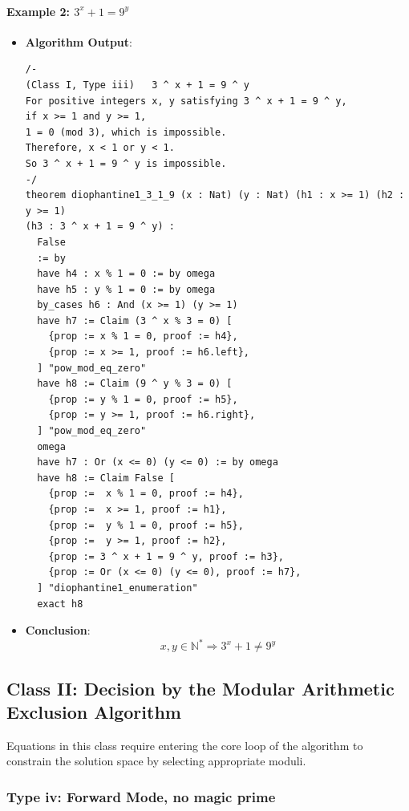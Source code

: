 \documentclass{article}
\begin{document}
\paragraph{Example 2: $3^x+1=9^y$}
\begin{itemize}
\item \textbf{Algorithm Output}:
    \begin{verbatim}
/-
(Class I, Type iii)   3 ^ x + 1 = 9 ^ y
For positive integers x, y satisfying 3 ^ x + 1 = 9 ^ y,
if x >= 1 and y >= 1,
1 = 0 (mod 3), which is impossible.
Therefore, x < 1 or y < 1.
So 3 ^ x + 1 = 9 ^ y is impossible.
-/
theorem diophantine1_3_1_9 (x : Nat) (y : Nat) (h1 : x >= 1) (h2 : y >= 1) 
(h3 : 3 ^ x + 1 = 9 ^ y) :      
  False
  := by
  have h4 : x % 1 = 0 := by omega
  have h5 : y % 1 = 0 := by omega
  by_cases h6 : And (x >= 1) (y >= 1)
  have h7 := Claim (3 ^ x % 3 = 0) [
    {prop := x % 1 = 0, proof := h4},
    {prop := x >= 1, proof := h6.left},
  ] "pow_mod_eq_zero"
  have h8 := Claim (9 ^ y % 3 = 0) [
    {prop := y % 1 = 0, proof := h5},
    {prop := y >= 1, proof := h6.right},
  ] "pow_mod_eq_zero"
  omega
  have h7 : Or (x <= 0) (y <= 0) := by omega
  have h8 := Claim False [
    {prop :=  x % 1 = 0, proof := h4},
    {prop :=  x >= 1, proof := h1},
    {prop :=  y % 1 = 0, proof := h5},
    {prop :=  y >= 1, proof := h2},
    {prop := 3 ^ x + 1 = 9 ^ y, proof := h3},
    {prop := Or (x <= 0) (y <= 0), proof := h7},
  ] "diophantine1_enumeration"
  exact h8
    \end{verbatim}
    \item \textbf{Conclusion}:
    \[ x, y \in \mathbb{N}^* \Rightarrow 3^x + 1 \neq 9^y \]
\end{itemize}

\subsection{Class II: Decision by the Modular Arithmetic Exclusion Algorithm}
\label{app:class2}
Equations in this class require entering the core loop of the algorithm to constrain the solution space by selecting appropriate moduli.

\subsubsection{Type iv: Forward Mode, no magic prime}
\end{document}
